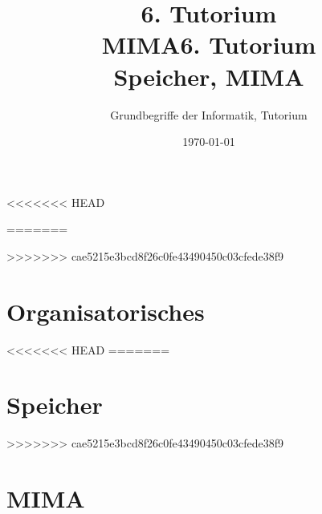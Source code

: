 




<<<<<<< HEAD
\title[\Kilian{Speicher 2, }MIMA]{6. Tutorium\\ MIMA}
=======
\title[Speicher, MIMA]{6. Tutorium\\ Speicher, MIMA}
>>>>>>> cae5215e3bcd8f26c0fe43490450c03cfede38f9
\subtitle{Grundbegriffe der Informatik, Tutorium \hashtag\mytutnumber}
\date{\today}


\titleframe
\roadmap


\section{Organisatorisches}
%

<<<<<<< HEAD
=======
\section{Speicher}


>>>>>>> cae5215e3bcd8f26c0fe43490450c03cfede38f9
\section{MIMA}




\section{}
\questionframe
\lastframe
{}
